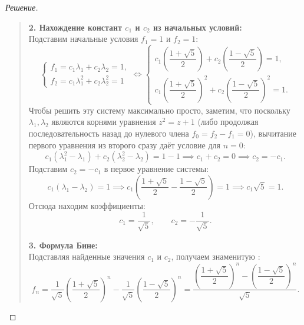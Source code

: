 \begin{example}
\begin{proof}[Решение]
\begin{quote}
            \textbf{2. Нахождение констант $c_1$ и $c_2$ из начальных 
            условий:}\\
            Подставим начальные условия $f_1 = 1$ и $f_2 = 1$:
            \[
                \begin{cases}
                    f_1 = c_1 \lambda_1 + c_2 \lambda_2 = 1, \\
                    f_2 = c_1 \lambda_1^2 + c_2 \lambda_2^2 = 1
                \end{cases}
                \iff
                \begin{cases}
                    c_1 \left(\dfrac{1 + \sqrt{5}}{2}\right) + 
                    c_2 \left(\dfrac{1 - \sqrt{5}}{2}\right) = 1, \\[3mm]
                    c_1 \left(\dfrac{1 + \sqrt{5}}{2}\right)^2 + 
                    c_2 \left(\dfrac{1 - \sqrt{5}}{2}\right)^2 = 1.
                \end{cases}
            \]
            Чтобы решить эту систему максимально просто, заметим, что 
            поскольку $\lambda_1, \lambda_2$ являются корнями уравнения 
            $z^2 = z + 1$ (либо продолжая последовательность назад до 
            нулевого члена $f_0 = f_2 - f_1 = 0$), вычитание первого 
            уравнения из второго сразу даёт условие для $n = 0$:
            \[
                c_1(\lambda_1^2 - \lambda_1) + c_2(\lambda_2^2 - \lambda_2) = 
                1 - 1 \implies c_1 + c_2 = 0 \implies c_2 = -c_1.
            \]
            Подставим $c_2 = -c_1$ в первое уравнение системы:
            \[
                c_1 (\lambda_1 - \lambda_2) = 1 \implies 
                c_1 \left( \frac{1 + \sqrt{5}}{2} - \frac{1 - \sqrt{5}}{2} \right) = 1 
                \implies c_1 \sqrt{5} = 1.
            \]
            Отсюда находим коэффициенты:
            \[
                c_1 = \frac{1}{\sqrt{5}}, \qquad c_2 = -\frac{1}{\sqrt{5}}.
            \]

            \textbf{3. Формула Бине:}\\
            Подставляя найденные значения $c_1$ и $c_2$, получаем знаменитую 
            :
            \begin{equation} \label{eq:binet_formula}
                f_n = \frac{1}{\sqrt{5}} \left(\frac{1 + \sqrt{5}}{2}\right)^n - 
                \frac{1}{\sqrt{5}} \left(\frac{1 - \sqrt{5}}{2}\right)^n = 
                \frac{\left(\dfrac{1 + \sqrt{5}}{2}\right)^n - 
                \left(\dfrac{1 - \sqrt{5}}{2}\right)^n}{\sqrt{5}}. \tag{15}
            \end{equation}
        \end{quote}
    \end{proof}
\end{example}

